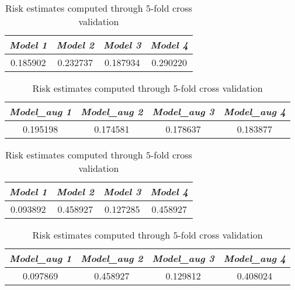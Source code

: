 \begin{table}
    \begin{subtable}{\textwidth}
        \centering
        \begin{tabular}{cccc}        
            \textsl{Model 1} & \textsl{Model 2} & \textsl{Model 3} & \textsl{Model 4} \\
            \midrule
            0.185902 & 0.232737 & 0.187934 & 0.290220
        \end{tabular}
    \end{subtable}
    \bigbreak
    \begin{subtable}{\textwidth}
        \centering
        \begin{tabular}{cccc}        
            \textsl{Model\_aug 1} & \textsl{Model\_aug 2} & \textsl{Model\_aug 3} & \textsl{Model\_aug 4} \\
            \midrule            
            0.195198 & 0.174581 & 0.178637 & 0.183877
        \end{tabular}
        \label{tab:riskEst_originalDataset}
    \end{subtable}
    \bigbreak
    \bigbreak
    \begin{subtable}{\textwidth}
        \centering
        \begin{tabular}{cccc}        
            \textsl{Model 1} & \textsl{Model 2} & \textsl{Model 3} & \textsl{Model 4} \\
            \midrule            
            0.093892 & 0.458927 & 0.127285 & 0.458927
        \end{tabular}
    \end{subtable}\bigbreak
    \begin{subtable}{\textwidth}
        \centering
        \begin{tabular}{cccc}        
            \textsl{Model\_aug 1} & \textsl{Model\_aug 2} & \textsl{Model\_aug 3} & \textsl{Model\_aug 4} \\
            \midrule            
            0.097869 & 0.458927 & 0.129812 & 0.408024
        \end{tabular}
        \label{tab:riskEst_datasetWithoutVal}
    \end{subtable}

    \caption{Risk estimates computed through $5$-fold cross validation}
    \label{tab:riskEstimates}
\end{table}